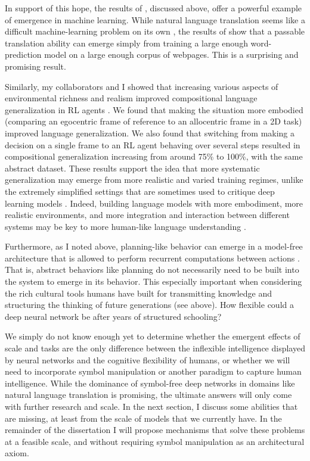 In support of this hope, the results of \citet{Radford2019}, discussed above, offer a powerful example of emergence in machine learning. While natural language translation seems like a difficult machine-learning problem on its own \citep{Wu2016}, the results of \citet{Radford2019} show that a passable translation ability can emerge simply from training a large enough word-prediction model on a large enough corpus of webpages. This is a surprising and promising result. \par 
Similarly, my collaborators and I showed that increasing various aspects of environmental richness and realism improved compositional language generalization in RL agents \citep{Hill2019a}. We found that making the situation more embodied (comparing an egocentric frame of reference to an allocentric frame in a 2D task) improved language generalization. We also found that switching from making a decision on a single frame to an RL agent behaving over several steps resulted in compositional generalization increasing from around 75\% to 100\%, with the same abstract dataset. These results support the idea that more systematic generalization may emerge from more realistic and varied training regimes, unlike the extremely simplified settings that are sometimes used to critique deep learning models \citep[see e.g.][]{Lake2017}. Indeed, building language models with more embodiment, more realistic environments, and more integration and interaction between different systems may be key to more human-like language understanding \citep{McClelland2019}.\par
Furthermore, as I noted above, planning-like behavior can emerge in a model-free architecture that is allowed to perform recurrent computations between actions \cite{Guez2019}. That is, abstract behaviors like planning do not necessarily need to be built into the system to emerge in its behavior. This especially important when considering the rich cultural tools humans have built for transmitting knowledge and structuring the thinking of future generations (see above). How flexible could a deep neural network be after years of structured schooling? \par 
We simply do not know enough yet to determine whether the emergent effects of scale and tasks are the only difference between the inflexible intelligence displayed by neural networks and the cognitive flexibility of humans, or whether we will need to incorporate symbol manipulation or another paradigm to capture human intelligence. While the dominance of symbol-free deep networks in domains like natural language translation is promising, the ultimate answers will only come with further research and scale. In the next section, I discuss some abilities that are missing, at least from the scale of models that we currently have. In the remainder of the dissertation I will propose mechanisms that solve these problems at a feasible scale, and without requiring symbol manipulation as an architectural axiom. \par 

